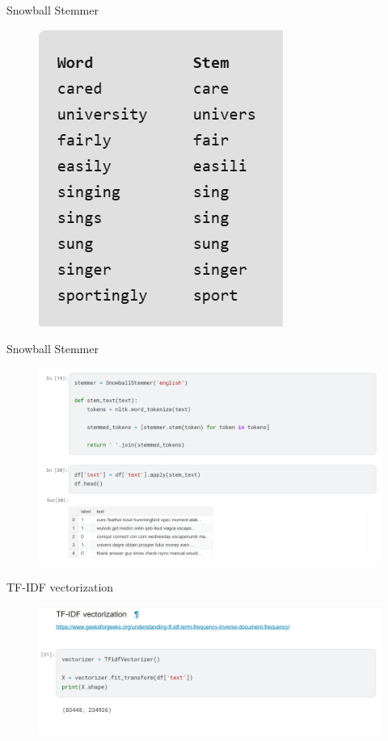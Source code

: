 \documentclass[serif, aspectratio=169]{beamer}
\begin{document}
	\begin{frame}{Snowball Stemmer}
		\begin{figure}
			\centering
			\includegraphics[width=0.4\linewidth]{pic/snowball-stemmer.png}
			\label{fig:snowball-stemmer}
		\end{figure}
	\end{frame}
	\begin{frame}{Snowball Stemmer}
		\begin{figure}
			\centering
			\includegraphics[width=0.8\linewidth]{pic/snowball-stemmer-apply.png}
			\label{fig:snowball-stemmer-apply}
		\end{figure}
	\end{frame}
	\begin{frame}{TF-IDF vectorization}
		\begin{figure}
			\centering
			\includegraphics[width=1\linewidth]{pic/tfidf-apply.png}
			\label{fig:tfidf-apply}
		\end{figure}
	\end{frame}
	
\end{document}
